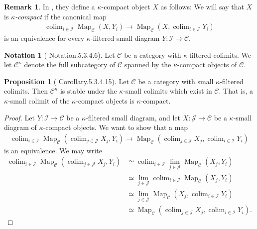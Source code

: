 \documentclass[a4paper,dvipdfmx,11pt,reqno]{amsart}
\DeclareMathOperator{\Map}{Map}
\DeclareMathOperator*{\colim}{colim}
\newcommand{\C}{\mathcal{C}}
\newcommand{\I}{\mathcal{I}}
\newcommand{\J}{\mathcal{J}}
\theoremstyle{definition}
\newtheorem{notation}[theorem]{Notation}
\newtheorem{proposition}[theorem]{Proposition}
\newtheorem{remark}[theorem]{Remark}
\begin{document}
\begin{remark} \label{rem.not_equiv_def_of_compact} 
  In \cite{KNP}, they define a $\kappa$-compact object $X$ as follows: 
  We will say that $X$ is \textit{$\kappa$-compact} if the canonical map 
  \begin{align*}
    \colim_{i \in \I}\Map_{\C}(X,Y_i) \to \Map_{\C}(X,\colim_{i \in \I} Y_i)
  \end{align*}
  is an equivalence for every $\kappa$-filtered small diagram $Y : \I \to \C$.
\end{remark}

\begin{notation}[\cite{HTT} Notation.5.3.4.6]
  Let $\C$ be a category with $\kappa$-filtered colimits.
  We let $\C^{\kappa}$ denote the full subcategory of $\C$ spanned by the $\kappa$-compact objects of $\C$.
\end{notation}

\begin{proposition}[\cite{HTT} Corollary.5.3.4.15] \label{HTT.5.3.4.15}
  Let $\C$ be a category with small $\kappa$-filtered colimits.
  Then $\C^\kappa$ is stable under the $\kappa$-small colimits which exist in $\C$.
  That is, a $\kappa$-small colimit of the $\kappa$-compact objects is $\kappa$-compact. 
\end{proposition}

\begin{proof}
  Let $Y : \I \to \C$ be a $\kappa$-filtered small diagram, and let $X : \J \to \C$ be a $\kappa$-small diagram of $\kappa$-compact objects.
  We want to show that a map
  \begin{align*}
    \colim_{i \in \I}\Map_{\C}(\colim_{j \in \J}X_j, Y_i) \to \Map_{\C}(\colim_{j \in \J}X_j, \colim_{i \in \I}Y_i)
  \end{align*}
  is an equivalence.
  We may write
  \begin{align*}
    \colim_{i \in \I}\Map_{\C}(\colim_{j \in \J}X_j, Y_i) 
    &\simeq \colim_{i \in \I}\lim_{j \in \J}\Map_{\C}(X_j,Y_i) \\
    &\simeq \lim_{j \in \J}\colim_{i \in \I}\Map_{\C}(X_j,Y_i) \\
    &\simeq \lim_{j \in \J}\Map_{\C}(X_j,\colim_{i \in \I}Y_i) \\
    &\simeq \Map_{\C}(\colim_{j \in \J}X_j,\colim_{i \in \I}Y_i).
  \end{align*}
\end{proof}
\end{document}
